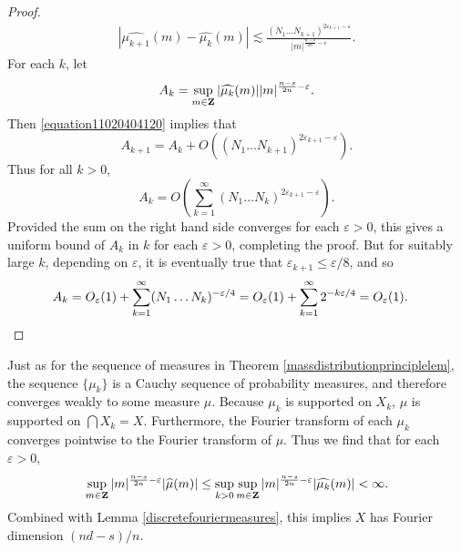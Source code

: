 \begin{proof}
    \begin{equation} \label{equation11020404120}
    \begin{split}
        |\widehat{\mu_{k+1}}(m) - \widehat{\mu_k}(m)| \lesssim \frac{(N_1 \dots N_{k+1})^{2\varepsilon_{k+1} - \varepsilon}}{|m|^{\frac{n-s}{2n} - \varepsilon}}.
    \end{split}
    \end{equation}
    For each $k$, let
    \[ A_k = \sup_{m \in \operatorname{\mathbf{Z}}} |\widehat{\mu_k}(m)| |m|^{\frac{n-s}{2n} - \varepsilon}. \]
    Then \eqref{equation11020404120} implies that
    \[ A_{k+1} = A_k + O \left( (N_1 \dots N_{k+1})^{2\varepsilon_{k+1} - \varepsilon} \right). \]
    Thus for all $k > 0$,
    \[ A_k = O \left( \sum_{k = 1}^\infty (N_1 \dots N_k)^{2\varepsilon_{k+1} - \varepsilon} \right). \]
    Provided the sum on the right hand side converges for each $\varepsilon > 0$, this gives a uniform bound of $A_k$ in $k$ for each $\varepsilon > 0$, completing the proof. But for suitably large $k$, depending on $\varepsilon$, it is eventually true that $\varepsilon_{k+1} \leq \varepsilon/8$, and so
    \begin{align*}
        A_k &= O_\varepsilon(1) + \sum_{k = 1}^\infty (N_1 \dots N_k)^{-\varepsilon/4} = O_\varepsilon(1) + \sum_{k = 1}^\infty 2^{-k\varepsilon/4} = O_\varepsilon(1). \qedhere
    \end{align*}
\end{proof}

Just as for the sequence of measures in Theorem \ref{massdistributionprinciplelem}, the sequence $\{ \mu_k \}$ is a Cauchy sequence of probability measures, and therefore converges weakly to some measure $\mu$. Because $\mu_k$ is supported on $X_k$, $\mu$ is supported on $\bigcap X_k = X$. Furthermore, the Fourier transform of each $\mu_k$ converges pointwise to the Fourier transform of $\mu$. Thus we find that for each $\varepsilon > 0$,
%
\[ \sup_{m \in \operatorname{\mathbf{Z}}} |m|^{\frac{n-s}{2n} - \varepsilon} |\widehat{\mu}(m)| \leq \sup_{k > 0} \sup_{m \in \operatorname{\mathbf{Z}}} |m|^{\frac{n-s}{2n} - \varepsilon} |\widehat{\mu_k}(m)| < \infty. \]
%
Combined with Lemma \ref{discretefouriermeasures}, this implies $X$ has Fourier dimension $(nd - s)/n$.

\endinput